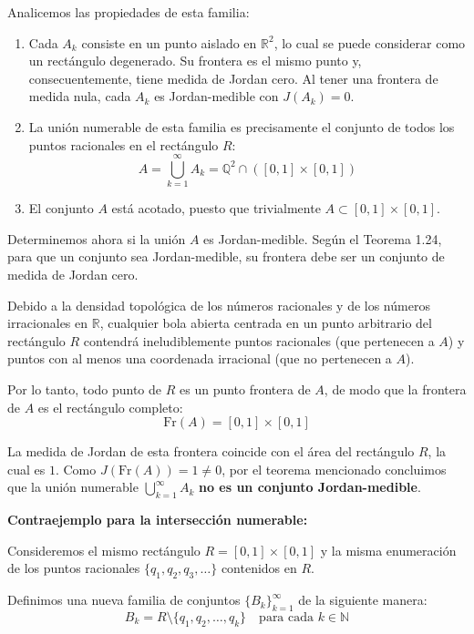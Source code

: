 \documentclass[11pt,letterpaper]{article}
\begin{document}
Analicemos las propiedades de esta familia:
\begin{enumerate}
    \item Cada $A_k$ consiste en un punto aislado en $\mathbb{R}^2$, lo cual se puede considerar como un rectángulo degenerado. Su frontera es el mismo punto y, consecuentemente, tiene medida de Jordan cero. Al tener una frontera de medida nula, cada $A_k$ es Jordan-medible con $J(A_k) = 0$.
    \item La unión numerable de esta familia es precisamente el conjunto de todos los puntos racionales en el rectángulo $R$:
    \begin{equation*}
    A = \bigcup_{k=1}^{\infty} A_k = \mathbb{Q}^2 \cap ([0,1] \times [0,1])
    \end{equation*}
    \item El conjunto $A$ está acotado, puesto que trivialmente $A \subset [0,1] \times [0,1]$.
\end{enumerate}

Determinemos ahora si la unión $A$ es Jordan-medible. Según el Teorema 1.24, para que un conjunto sea Jordan-medible, su frontera debe ser un conjunto de medida de Jordan cero. 

Debido a la densidad topológica de los números racionales y de los números irracionales en $\mathbb{R}$, cualquier bola abierta centrada en un punto arbitrario del rectángulo $R$ contendrá ineludiblemente puntos racionales (que pertenecen a $A$) y puntos con al menos una coordenada irracional (que no pertenecen a $A$). 

Por lo tanto, todo punto de $R$ es un punto frontera de $A$, de modo que la frontera de $A$ es el rectángulo completo:
\begin{equation*}
\text{Fr}(A) = [0,1] \times [0,1]
\end{equation*}

La medida de Jordan de esta frontera coincide con el área del rectángulo $R$, la cual es $1$. Como $J(\text{Fr}(A)) = 1 \neq 0$, por el teorema mencionado concluimos que la unión numerable $\bigcup_{k=1}^{\infty} A_k$ \textbf{no es un conjunto Jordan-medible}.

\vspace{0.5cm}
\textbf{Contraejemplo para la intersección numerable:}

Consideremos el mismo rectángulo $R = [0,1] \times [0,1]$ y la misma enumeración de los puntos racionales $\{q_1, q_2, q_3, \dots\}$ contenidos en $R$. 

Definimos una nueva familia de conjuntos $\{B_k\}_{k=1}^{\infty}$ de la siguiente manera:
\begin{equation*}
B_k = R \setminus \{q_1, q_2, \dots, q_k\} \quad \text{para cada } k \in \mathbb{N}
\end{equation*}
\end{document}
